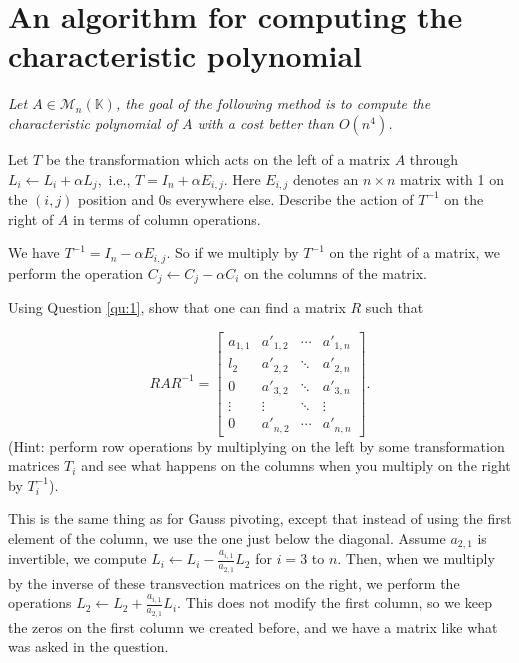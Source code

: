 \documentclass[11pt]{exam}
\theoremstyle{definition}
\begin{document}
{\begin{questions}
\begin{solution}
  \end{solution}
  
\end{questions}
  
\section{An algorithm for computing the characteristic polynomial}

{\em Let $A\in\mathcal{M}_n(\mathbb{K})$, the goal of the following method is to
	compute the characteristic polynomial of $A$ with a cost better than $O(n^4)$.}

\begin{questions}
	
	\question \label{qu:1}
	Let $T$ be the transformation which acts on the left of a matrix $A$ through $L_i\leftarrow L_i+\alpha L_j,$ i.e., $T=I_n+\alpha E_{i,j}$. Here $E_{i,j}$ denotes an $n\times n$ matrix with 1 on the $(i,j)$ position and 0s everywhere else. Describe the
	action of $T^{-1}$ on the right of $A$ in terms of column operations.
	
	\begin{solution}
		We have $T^{-1} = I_n - \alpha E_{i,j}$. So if we multiply by $T^{-1}$ on the right of a matrix, we perform the operation $C_j \leftarrow C_j - \alpha C_i$ on the columns of the matrix.
	\end{solution}
	
	
	\question Using Question \ref{qu:1}, show that one can find
	a matrix $R$ such that
	
	\[
	RAR^{-1} =
	\begin{bmatrix}
	a_{1,1} & a'_{1,2} & \cdots & a'_{1,n} \\
	l_2 & a'_{2,2} & \ddots & a'_{2,n} \\
	0 & a'_{3,2} & \ddots & a'_{3,n} \\
	\vdots & \vdots & \ddots & \vdots \\
	0 & a'_{n,2} & \cdots & a'_{n,n}
	\end{bmatrix}.
	\]
	(Hint: perform row operations by multiplying on the left by some transformation matrices $T_i$ and see what happens on the columns when you multiply on the right by $T_i^{-1}$).
	\begin{solution}
		This is the same thing as for Gauss pivoting, except that instead of using the first element of the column, we use the one just below the diagonal. Assume $a_{2,1}$ is invertible, we compute $L_i \leftarrow L_i - \frac{a_{i,1}}{a_{2,1}} L_2$ for $i = 3$ to $n$. Then, when we multiply by the inverse of these transvection matrices on the right, we perform the operations $L_2 \leftarrow L_2 + \frac{a_{i,1}}{a_{2,1}} L_i$. This does not modify the first column, so we keep the zeros on the first column we created before, and we have a matrix like what was asked in the question.
		

\end{solution}
\end{questions}}
\end{document}
